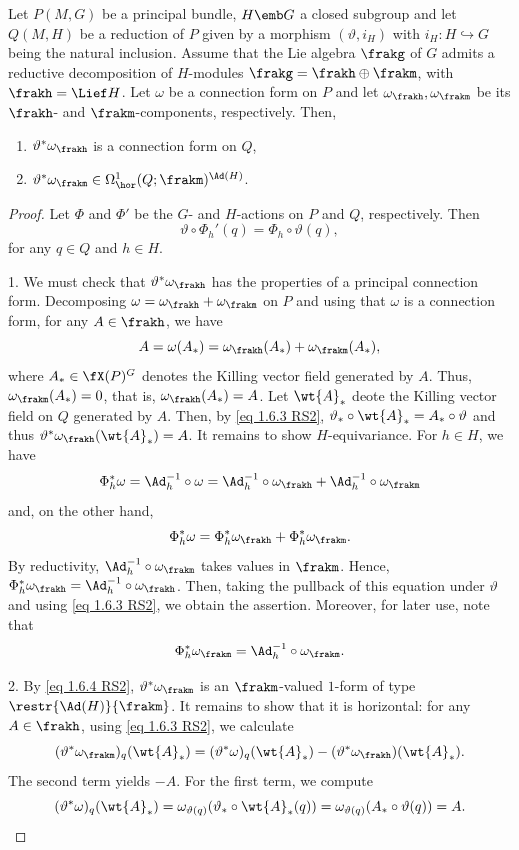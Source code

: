 \begin{prop}[{{\cite[Prop.~1.6.8]{RS2}}}]\label{prop 1.6.8 RS2}
    Let $P(M,G)$ be a principal bundle, $H\emb G$ a closed subgroup and let $Q(M,H)$ be a reduction of $P$ given by a morphism $(\vartheta,i_H)$ with $i_H:H\hookrightarrow G$ being the natural inclusion. Assume that the Lie algebra $\frakg$ of $G$ admits a reductive decomposition of $H$-modules
    $\frakg=\frakh\oplus\frakm$,
    with $\frakh=\Lief H$. Let $\omega$ be a connection form on $P$ and let $\omega_\frakh,\omega_\frakm$ be its $\frakh$- and $\frakm$-components, respectively. Then,
    \begin{enumerate}
        \item $\vartheta^\ast\omega_\frakh$ is a connection form on $Q$,
        \item $\vartheta^\ast\omega_\frakm\in \Omega^1_{\hor}(Q;\frakm)^{\Ad(H)}$.
    \end{enumerate}
\end{prop}
\begin{proof}
    Let $\Phi$ and $\Phi'$ be the $G$- and $H$-actions on $P$ and $Q$, respectively. Then
    \[\vartheta\circ\Phi_h'(q)=\Phi_h\circ \vartheta(q),\label{eq 1.6.3 RS2}\]
    for any $q\in Q$ and $h\in H$.
    
    1. We must check that $\vartheta^\ast\omega_\frakh$ has the properties of a principal connection form. Decomposing $\omega=\omega_\frakh+\omega_\frakm$ on $P$ and using that $\omega$ is a connection form, for any $A\in\frakh$, we have
    \[A=\omega(A_\ast)=\omega_\frakh(A_\ast)+\omega_\frakm(A_\ast),\]
    where $A_\ast\in \fX(P)^G$ denotes the Killing vector field generated by $A$. Thus, $\omega_\frakm(A_\ast)=0$, that is, $\omega_\frakh(A_\ast)=A$. Let $\wt{A}_\ast$ deote the Killing vector field on $Q$ generated by $A$. Then, by \eqref{eq 1.6.3 RS2}, $\vartheta_\ast\circ \wt{A}_\ast=A_\ast\circ\vartheta$ and thus $\vartheta^\ast\omega_\frakh(\wt{A}_\ast)=A$. It remains to show $H$-equivariance. For $h\in H$, we have
    \[\Phi_h^\ast\omega=\Ad_h^{-1}\circ \omega=\Ad_h^{-1}\circ \omega_\frakh+\Ad_h^{-1}\circ\omega_\frakm\]
    and, on the other hand,
    \[\Phi^\ast_h\omega=\Phi^\ast_h\omega_\frakh+\Phi^\ast_h\omega_\frakm.\]
    By reductivity, $\Ad_h^{-1}\circ\omega_\frakm$ takes values in $\frakm$. Hence, $\Phi^\ast_h\omega_\frakh=\Ad_h^{-1}\circ\omega_\frakh$. Then, taking the pullback of this equation under $\vartheta$ and using \eqref{eq 1.6.3 RS2}, we obtain the assertion. Moreover, for later use, note that
    \[\Phi_h^\ast\omega_\frakm=\Ad_h^{-1}\circ\omega_\frakm.\label{eq 1.6.4 RS2}\]

    2. By \eqref{eq 1.6.4 RS2}, $\vartheta^\ast\omega_\frakm$ is an $\frakm$-valued $1$-form of type $\restr{\Ad(H)}{\frakm}$. It remains to show that it is horizontal: for any $A\in\frakh$, using \eqref{eq 1.6.3 RS2}, we calculate
    \[(\vartheta^\ast\omega_\frakm)_q(\wt{A}_\ast)=(\vartheta^\ast\omega)_q(\wt{A}_\ast)-(\vartheta^\ast\omega_\frakh)(\wt{A}_\ast).\]
    The second term yields $-A$. For the first term, we compute
    \[(\vartheta^\ast\omega)_q(\wt{A}_\ast)=\omega_{\vartheta(q)}(\vartheta_\ast\circ \wt{A}_\ast(q))=\omega_{\vartheta(q)}(A_\ast\circ \vartheta(q))=A.\]
\end{proof}


